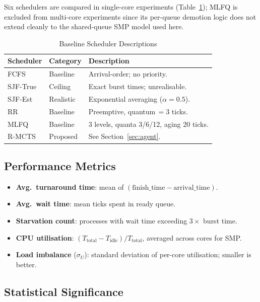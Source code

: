 \documentclass[10pt,journal,compsoc]{IEEEtran}
\begin{document}
Six schedulers are compared in single-core experiments
(Table~\ref{tab:schedulers}); MLFQ is excluded from multi-core
experiments since its per-queue demotion logic does not extend cleanly
to the shared-queue SMP model used here.

\begin{table}[!t]
\centering
\caption{Baseline Scheduler Descriptions}
\label{tab:schedulers}
\renewcommand{\arraystretch}{1.1}
\begin{tabular}{@{}l l p{4.0cm}@{}}
\toprule
\textbf{Scheduler} & \textbf{Category} & \textbf{Description} \\
\midrule
FCFS      & Baseline  & Arrival-order; no priority. \\
SJF-True  & Ceiling   & Exact burst times; unrealisable. \\
SJF-Est   & Realistic & Exponential averaging ($\alpha{=}0.5$). \\
RR        & Baseline  & Preemptive, quantum\,$=3$ ticks. \\
MLFQ      & Baseline  & 3 levels, quanta 3/6/12, aging 20 ticks. \\
R-MCTS    & Proposed  & See Section~\ref{sec:agent}. \\
\bottomrule
\end{tabular}
\end{table}

\subsection{Performance Metrics}

\begin{itemize}
  \item \textbf{Avg.\ turnaround time}: mean of
    $(\text{finish\_time}-\text{arrival\_time})$.
  \item \textbf{Avg.\ wait time}: mean ticks spent in ready queue.
  \item \textbf{Starvation count}: processes with wait time exceeding
    $3{\times}$ burst time.
  \item \textbf{CPU utilisation}: $(T_{\text{total}}-T_{\text{idle}})/T_{\text{total}}$,
    averaged across cores for SMP.
  \item \textbf{Load imbalance} ($\sigma_U$): standard deviation of
    per-core utilisation; smaller is better.
\end{itemize}

\subsection{Statistical Significance}
\end{document}
